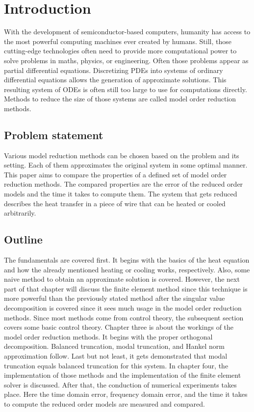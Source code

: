 \chapter{Introduction}
With the development of semiconductor-based computers, humanity has access to the most powerful computing machines ever created by humans. Still, those cutting-edge technologies often need to provide more computational power to solve problems in maths, physics, or engineering. Often those problems appear as partial differential equations. Discretizing PDEs into systems of ordinary differential equations allows the generation of approximate solutions. This resulting system of ODEs is often still too large to use for computations directly. Methods to reduce the size of those systems are called model order reduction methods.

\section{Problem statement}
Various model reduction methods can be chosen based on the problem and its setting. Each of them approximates the original system in some optimal manner. This paper aims to compare the properties of a defined set of model order reduction methods. The compared properties are the error of the reduced order models and the time it takes to compute them. The system that gets reduced describes the heat transfer in a piece of wire that can be heated or cooled arbitrarily.

\section{Outline}
The fundamentals are covered first. It begins with the basics of the heat equation and how the already mentioned heating or cooling works, respectively. Also, some naive method to obtain an approximate solution is covered. However, the next part of that chapter will discuss the finite element method since this technique is more powerful than the previously stated method after the singular value decomposition is covered since it sees much usage in the model order reduction methods. Since most methods come from control theory, the subsequent section covers some basic control theory. Chapter three is about the workings of the model order reduction methods. It begins with the proper orthogonal decomposition. Balanced truncation, modal truncation, and Hankel norm approximation follow.
Last but not least, it gets demonstrated that modal truncation equals balanced truncation for this system. In chapter four, the implementation of those methods and the implementation of the finite element solver is discussed. After that, the conduction of numerical experiments
takes place. Here the time domain error, frequency domain error, and the time it takes to compute the reduced order models are measured and compared.